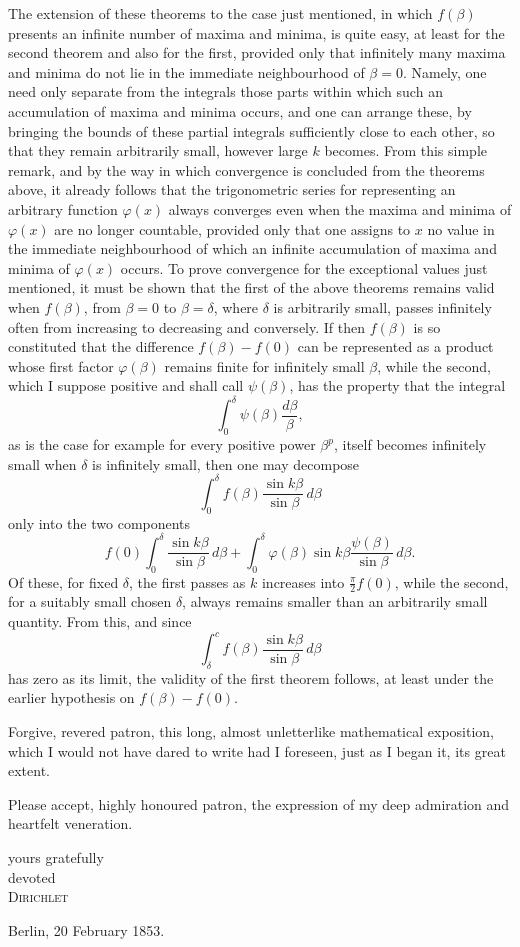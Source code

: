 \documentclass[11pt]{article}
\newcommand{\scn}[1]{\textsc{#1}}
\begin{document}
The extension of these theorems to the case just mentioned, in which $f(\beta)$ presents an infinite number of maxima and minima, is quite easy, at least for the second theorem and also for the first, provided only that infinitely many maxima and minima do not lie in the immediate neighbourhood of $\beta=0$. Namely, one need only separate from the integrals those parts within which such an accumulation of maxima and minima occurs, and one can arrange these, by bringing the bounds of these partial integrals sufficiently close to each other, so that they remain arbitrarily small, however large $k$ becomes. From this simple remark, and by the way in which convergence is concluded from the theorems above, it already follows that the trigonometric series for representing an arbitrary function $\varphi(x)$ always converges even when the maxima and minima of $\varphi(x)$ are no longer countable, provided only that one assigns to $x$ no value in the immediate neighbourhood of which an infinite accumulation of maxima and minima of $\varphi(x)$ occurs. To prove convergence for the exceptional values just mentioned, it must be shown that the first of the above theorems remains valid when $f(\beta)$, from $\beta=0$ to $\beta=\delta$, where $\delta$ is arbitrarily small, passes infinitely often from increasing to decreasing and conversely. If then $f(\beta)$ is so constituted that the difference $f(\beta)-f(0)$ can be represented as a product whose first factor $\varphi(\beta)$ remains finite for infinitely small $\beta$, while the second, which I suppose positive and shall call $\psi(\beta)$, has the property that the integral
\[
 \int_0^\delta \psi(\beta)\frac{d\beta}{\beta},
\]
as is the case for example for every positive power $\beta^p$, itself becomes infinitely small when $\delta$ is infinitely small, then one may decompose
\[
 \int_0^\delta f(\beta)\frac{\sin k\beta}{\sin\beta}\,d\beta
\]
only into the two components
\[
 f(0)\int_0^\delta \frac{\sin k\beta}{\sin\beta}\,d\beta
 +\int_0^\delta \varphi(\beta)\sin k\beta\frac{\psi(\beta)}{\sin\beta}\,d\beta.
\]
Of these, for fixed $\delta$, the first passes as $k$ increases into $\frac\pi2 f(0)$, while the second, for a suitably small chosen $\delta$, always remains smaller than an arbitrarily small quantity. From this, and since
\[
 \int_\delta^c f(\beta)\frac{\sin k\beta}{\sin\beta}\,d\beta
\]
has zero as its limit, the validity of the first theorem follows, at least under the earlier hypothesis on $f(\beta)-f(0)$.

Forgive, revered patron, this long, almost unletterlike mathematical exposition, which I would not have dared to write had I foreseen, just as I began it, its great extent.

Please accept, highly honoured patron, the expression of my deep admiration and heartfelt veneration.

\begin{flushright}
yours gratefully\\
devoted\\
\scn{Dirichlet}
\end{flushright}
Berlin, 20 February 1853.
\end{document}
